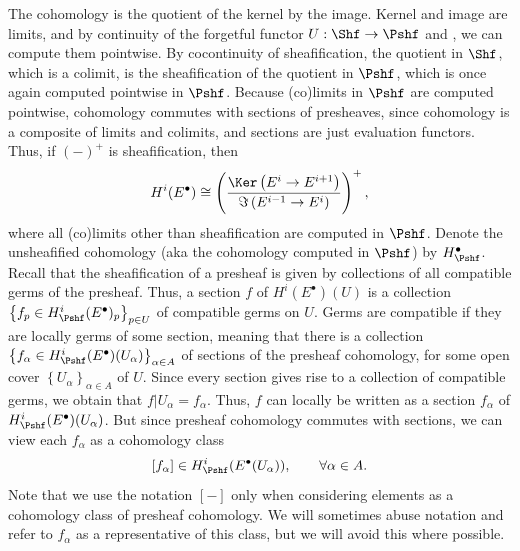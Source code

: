 \begin{discussion}
	The cohomology is the quotient of the kernel by the image. Kernel and image are limits, and by continuity of the forgetful functor $U : \Shf  \to \Pshf $ and \cite{ml}, we can compute them pointwise. By cocontinuity of sheafification, the quotient in $\Shf $, which is a colimit, is the sheafification of the quotient in $\Pshf $, which is once again computed pointwise in $\Pshf $. Because (co)limits in $\Pshf $ are computed pointwise, cohomology commutes with sections of presheaves, since cohomology is a composite of limits and colimits, and sections are just evaluation functors. Thus, if $(-)^+$ is sheafification, then
	\[
		H^i(E^{\bullet} ) \cong \left( \frac{\Ker \left( E^i \to E^{i+1}  \right) }{\Im \left( E^{i-1}  \to E^i \right) }  \right) ^+,
	\]
	where all (co)limits other than sheafification are computed in $\Pshf $. Denote the unsheafified cohomology (aka the cohomology computed in $\Pshf $) by $H^{\bullet} _{\Pshf } $. Recall that the sheafification of a presheaf is given by collections of all compatible germs of the presheaf. Thus, a section $f$ of $H^i(E^{\bullet} )(U)$ is a collection $\left\{ f_p  \in H^i_{\Pshf } (E^{\bullet} )_p \right\}_{p \in U} $ of compatible germs on $U$. Germs are compatible if they are locally germs of some section, meaning that there is a collection $\left\{ f_\alpha \in H^i_{\Pshf }(E^{\bullet} )(U_\alpha ) \right\}_{\alpha \in A} $ of sections of the presheaf cohomology, for some open cover $\left\{ U_\alpha  \right\} _{\alpha \in A} $ of $U$. Since every section gives rise to a collection of compatible germs, we obtain that $f|U_\alpha  = f_\alpha $. Thus, $f$ can locally be written as a section $f_\alpha $ of $H^i_{\Pshf } (E^{\bullet} )(U_\alpha )$. But since presheaf cohomology commutes with sections, we can view each $f_\alpha $ as a cohomology class
	\[
		[f_\alpha]  \in H^i_{\Pshf }(E^{\bullet} (U_\alpha )),\qquad \forall \alpha \in A
	.\]
	Note that we use the notation $[-]$ only when considering elements as a cohomology class of presheaf cohomology. We will sometimes abuse notation and refer to $f_\alpha $ as a representative of this class, but we will avoid this where possible.
	

\end{discussion}
